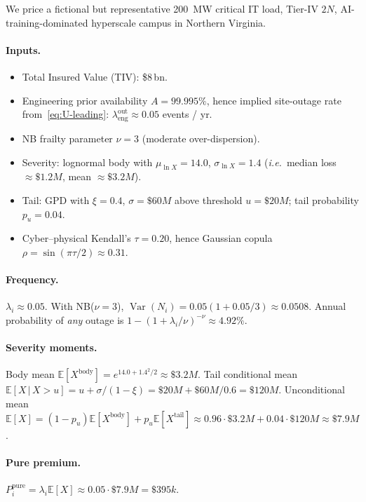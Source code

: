 \documentclass[11pt,a4paper]{article}
\theoremstyle{ia}
\newcommand{\E}{\mathbb{E}}
\newcommand{\Var}{\operatorname{Var}}
\newcommand{\1}{\mathbf{1}}
\newcommand{\given}{\,\vert\,}
\begin{document}
\begin{ebox}
We price a fictional but representative \SI{200}{\mega\watt} critical
IT load, Tier-IV $2N$, AI-training-dominated hyperscale campus in
Northern Virginia.

\paragraph{Inputs.}
\begin{itemize}[nosep,leftmargin=*]
  \item Total Insured Value (TIV): \$8\,bn.
  \item Engineering prior availability $A=99.995\%$, hence implied
        site-outage rate from~\eqref{eq:U-leading}:
        $\lambda^{\mathrm{out}}_{\mathrm{eng}}\approx 0.05$ events / yr.
  \item NB frailty parameter $\nu = 3$ (moderate over-dispersion).
  \item Severity: lognormal body with $\mu_{\ln X}=14.0$,
        $\sigma_{\ln X}=1.4$ (\textit{i.e.}\ median loss
        $\approx\$1.2M$, mean $\approx\$3.2M$).
  \item Tail: GPD with $\xi=0.4$, $\sigma=\$60M$ above threshold $u=\$20M$;
        tail probability $p_u=0.04$.
  \item Cyber--physical Kendall's $\tau=0.20$, hence Gaussian
        copula $\rho=\sin(\pi\tau/2)\approx 0.31$.
\end{itemize}

\paragraph{Frequency.}
$\lambda_i\approx 0.05$. With NB($\nu=3$),
$\Var(N_i)=0.05(1+0.05/3)\approx 0.0508$. Annual probability of
\emph{any} outage is $1-(1+\lambda_i/\nu)^{-\nu}\approx 4.92\%$.

\paragraph{Severity moments.}
Body mean $\E[X^{\mathrm{body}}]=e^{14.0+1.4^2/2}\approx \$3.2M$.
Tail conditional mean $\E[X\given X>u]=u+\sigma/(1-\xi)=\$20M+\$60M/0.6=\$120M$.
Unconditional mean
$\E[X]=(1-p_u)\E[X^{\mathrm{body}}]+p_u\E[X^{\mathrm{tail}}]\approx
0.96\cdot\$3.2M+0.04\cdot\$120M\approx\$7.9M$.

\paragraph{Pure premium.}
$P^{\mathrm{pure}}_i=\lambda_i\E[X]\approx 0.05\cdot\$7.9M=\$395k$.


\end{ebox}
\end{document}
